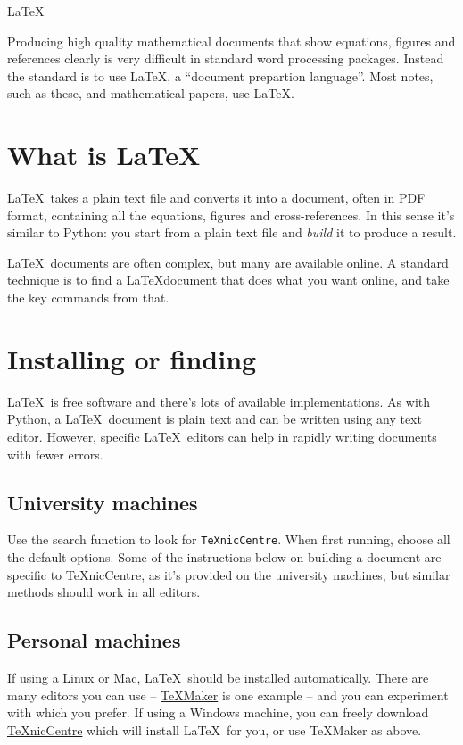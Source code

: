 \begin{chapter}{\LaTeX}

Producing high quality mathematical documents that show equations, figures and references clearly is very difficult in standard word processing packages. Instead the standard is to use \LaTeX, a ``document prepartion language''. Most notes, such as these, and mathematical papers, use \LaTeX.

\section{What is \LaTeX}

\LaTeX\ takes a plain text file and converts it into a document, often in PDF format, containing all the equations, figures and cross-references. In this sense it's similar to Python: you start from a plain text file and \emph{build} it to produce a result.

\LaTeX\ documents are often complex, but many are available online. A standard technique is to find a \LaTeX document that does what you want online, and take the key commands from that.

\section{Installing or finding}
\label{sec:installing}

\LaTeX\ is free software and there's lots of available implementations. As with Python, a \LaTeX\ document is plain text and can be written using any text editor. However, specific \LaTeX\ editors can help in rapidly writing documents with fewer errors.

\subsection{University machines}

Use the search function to look for \texttt{TeXnicCentre}. When first running, choose all the default options. Some of the instructions below on building a document are specific to TeXnicCentre, as it's provided on the university machines, but similar methods should work in all editors.

\subsection{Personal machines}

If using a Linux or Mac, \LaTeX\ should be installed automatically. There are many editors you can use -- \href{http://www.xm1math.net/texmaker/}{TeXMaker} is one example -- and you can experiment with which you prefer. If using a Windows machine, you can freely download \href{http://www.texniccenter.org/}{TeXnicCentre} which will install \LaTeX\ for you, or use TeXMaker as above.


\end{chapter}
